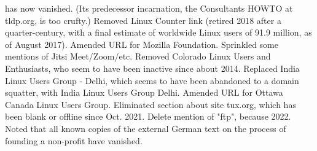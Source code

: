 \begin{itemize}
has now vanished.  (Its predecessor incarnation, the Consultants HOWTO at tldp.org, 
is too crufty.)  Removed Linux Counter link (retired 2018 after a quarter-century, 
with a final estimate of worldwide Linux users of 91.9 million, as of August 2017).
Amended URL for Mozilla Foundation.  Sprinkled some mentions of Jitsi Meet/Zoom/etc.
Removed Colorado Linux Users and Enthusiasts, who seem to have been inactive since 
about 2014.  Replaced India Linux Users Group - Delhi, which seems to have been abandoned 
to a domain squatter, with India Linux Users Group Delhi.  Amended URL for Ottawa 
Canada Linux Users Group.  Eliminated section about site tux.org, which has been blank
or offline since Oct. 2021.  Delete mention of "ftp", because 2022.  Noted that 
all known copies of the external German text on the process of founding a non-profit have 
vanished.
\end{itemize}


